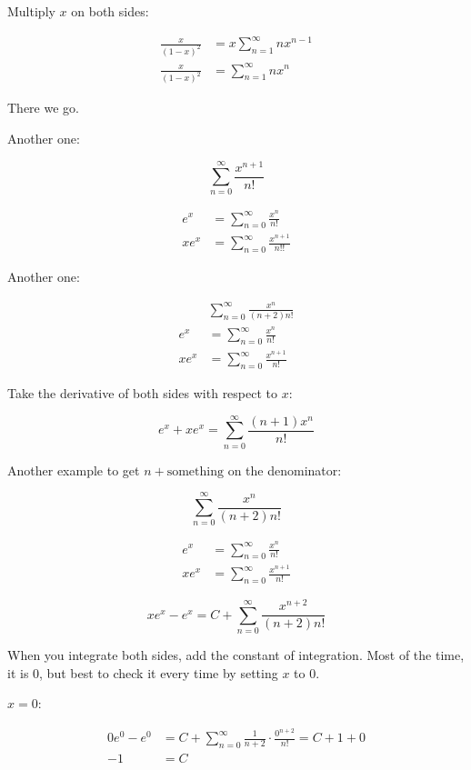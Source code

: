 \documentclass[12pt]{article}
\theoremstyle{plain}
\theoremstyle{remark}
\theoremstyle{definition}
\begin{document}
Multiply \(x\) on both sides:

\begin{align*}
\frac{x}{(1 - x)^{2}} &= x\sum_{n = 1}^{\infty}{nx^{n - 1}} \\
\frac{x}{(1 - x)^{2}} &= \sum_{n = 1}^{\infty}{nx^{n}}
\end{align*}


There we go.

Another one:

\[\sum_{n = 0}^{\infty}\frac{x^{n + 1}}{n!}\]

\begin{align*}
e^{x} &= \sum_{n = 0}^{\infty}\frac{x^{n}}{n!} \\
xe^{x} &= \sum_{n = 0}^{\infty}\frac{x^{n + 1}}{n!!}
\end{align*}


Another one:

\begin{align*}
&\sum_{n = 0}^{\infty}\frac{x^{n}}{(n + 2)n!} \\
e^{x} &= \sum_{n = 0}^{\infty}\frac{x^{n}}{n!} \\
xe^{x} &= \sum_{n = 0}^{\infty}\frac{x^{n + 1}}{n!}
\end{align*}


Take the derivative of both sides with respect to \(x\):

\[e^{x} + xe^{x} = \sum_{n = 0}^{\infty}\frac{(n + 1)x^{n}}{n!}\]

Another example to get \(n + \text{something}\) on the denominator:

\[\sum_{n = 0}^{\infty}\frac{x^{n}}{(n + 2)n!}\]

\begin{align*}
e^{x} &= \sum_{n = 0}^{\infty}\frac{x^{n}}{n!} \\
xe^{x} &= \sum_{n = 0}^{\infty}\frac{x^{n + 1}}{n!}
\end{align*}


\[xe^{x} - e^{x} = C + \sum_{n = 0}^{\infty}\frac{x^{n + 2}}{(n + 2)n!}\]

When you integrate both sides, add the constant of integration. Most of
the time, it is 0, but best to check it every time by setting \(x\) to
0.

\(x = 0\):

\begin{align*}
0e^{0} - e^{0} &= C + \sum_{n = 0}^{\infty}{\frac{1}{n + 2} \cdot \frac{0^{n + 2}}{n!}} = C + 1 + 0 \\
- 1 &= C
\end{align*}
\end{document}

